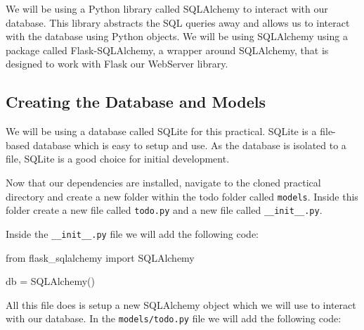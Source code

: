 \documentclass{csse4400}
\begin{document}
We will be using a Python library called SQLAlchemy to interact with our database.
This library abstracts the SQL queries away and allows us to interact with the database using Python objects.
We will be using SQLAlchemy using a package called Flask-SQLAlchemy, a wrapper around SQLAlchemy,
that is designed to work with Flask our WebServer library.


\subsection{Creating the Database and Models}

We will be using a database called SQLite for this practical.
SQLite is a file-based database which is easy to setup and use.
As the database is isolated to a file, SQLite is a good choice for initial development.

Now that our dependencies are installed,
navigate to the cloned practical directory and create a new folder within the todo folder called \texttt{models}.
Inside this folder create a new file called \texttt{todo.py} and a new file called \texttt{\_\_init\_\_.py}.

Inside the \texttt{\_\_init\_\_.py} file we will add the following code:

\begin{code}[language=python,numbers=none]{}
  from flask_sqlalchemy import SQLAlchemy

  db = SQLAlchemy()
\end{code}

All this file does is setup a new SQLAlchemy object which we will use to interact with our database.
In the \texttt{models/todo.py} file we will add the following code:
\end{document}

